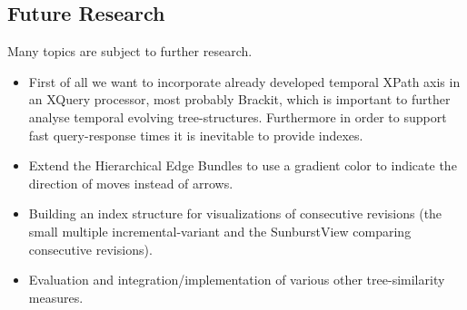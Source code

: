 \subsection{Future Research}
Many topics are subject to further research. 

\begin{itemize}
\item First of all we want to incorporate already developed temporal XPath axis in an XQuery processor, most probably Brackit\cite{Brackit}, which is important to further analyse temporal evolving tree-structures. Furthermore in order to support fast query-response times it is inevitable to provide indexes. 
\item Extend the Hierarchical Edge Bundles to use a gradient color to indicate the direction of moves instead of arrows.
\item Building an index structure for visualizations of consecutive revisions (the small multiple incremental-variant and the SunburstView comparing consecutive revisions).
\item Evaluation and integration/implementation of various other tree-similarity measures.
\end{itemize} 
